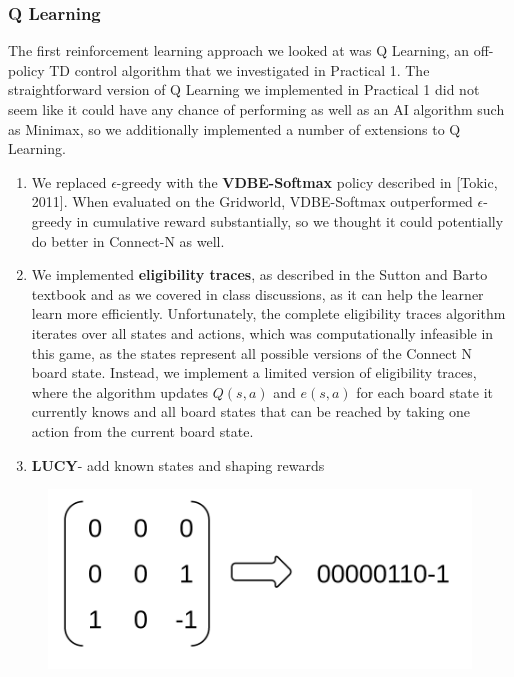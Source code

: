 \documentclass[12pt]{article}
\begin{document}
\subsubsection{Q Learning}

The first reinforcement learning approach we looked at was Q Learning, an off-policy TD control algorithm that we investigated in Practical 1. The straightforward version of Q Learning we implemented in Practical 1 did not seem like it could have any chance of performing as well as an AI algorithm such as Minimax, so we additionally implemented a number of extensions to Q Learning.

\begin{enumerate}
\item We replaced $\epsilon$-greedy with the \textbf{VDBE-Softmax} policy described in [Tokic, 2011]. When evaluated on the Gridworld, VDBE-Softmax outperformed $\epsilon$-greedy in cumulative reward substantially, so we thought it could potentially do better in Connect-N as well.
\item We implemented \textbf{eligibility traces}, as described in the Sutton and Barto textbook and as we covered in class discussions, as it can help the learner learn more efficiently. Unfortunately, the complete eligibility traces algorithm iterates over all states and actions, which was computationally infeasible in this game, as the states represent all possible versions of the Connect N board state. Instead, we implement a limited version of eligibility traces, where the algorithm updates $Q(s, a)$ and $e(s, a)$ for each board state it currently knows and all board states that can be reached by taking one action from the current board state.
\item \textbf{LUCY}- add known states and shaping rewards

\end{enumerate}

\begin{figure}
	\includegraphics[scale=.16]{transform}
\end{figure}
\end{document}
